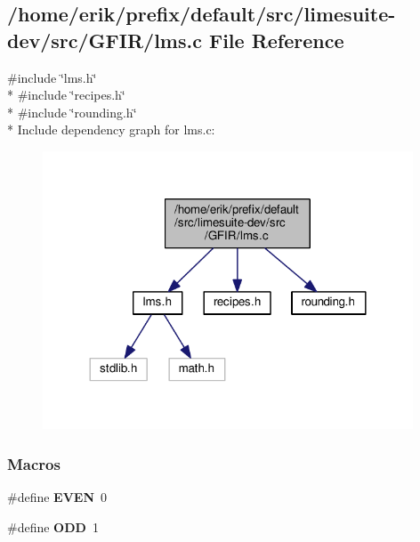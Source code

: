 \subsection{/home/erik/prefix/default/src/limesuite-\/dev/src/\+G\+F\+I\+R/lms.c File Reference}
\label{lms_8c}
{\ttfamily \#include \char`\"{}lms.\+h\char`\"{}}\\*
{\ttfamily \#include \char`\"{}recipes.\+h\char`\"{}}\\*
{\ttfamily \#include \char`\"{}rounding.\+h\char`\"{}}\\*
Include dependency graph for lms.\+c\+:
\nopagebreak
\begin{figure}[H]
\begin{center}
\leavevmode
\includegraphics[width=312pt]{d8/d6b/lms_8c__incl}
\end{center}
\end{figure}
\subsubsection*{Macros}
\begin{DoxyCompactItemize}
\item 
\#define {\bf E\+V\+EN}~0
\item 
\#define {\bf O\+DD}~1
\end{DoxyCompactItemize}

